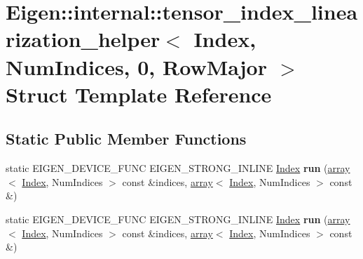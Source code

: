 \hypertarget{struct_eigen_1_1internal_1_1tensor__index__linearization__helper_3_01_index_00_01_num_indices_00_010_00_01_row_major_01_4}{}\section{Eigen\+:\+:internal\+:\+:tensor\+\_\+index\+\_\+linearization\+\_\+helper$<$ Index, Num\+Indices, 0, Row\+Major $>$ Struct Template Reference}
\label{struct_eigen_1_1internal_1_1tensor__index__linearization__helper_3_01_index_00_01_num_indices_00_010_00_01_row_major_01_4}
\subsection*{Static Public Member Functions}
\begin{DoxyCompactItemize}
\item 
\mbox{\label{struct_eigen_1_1internal_1_1tensor__index__linearization__helper_3_01_index_00_01_num_indices_00_010_00_01_row_major_01_4_ae99a24749608c2be04fae01f950a27e3}} 
static E\+I\+G\+E\+N\+\_\+\+D\+E\+V\+I\+C\+E\+\_\+\+F\+U\+NC E\+I\+G\+E\+N\+\_\+\+S\+T\+R\+O\+N\+G\+\_\+\+I\+N\+L\+I\+NE \hyperlink{namespace_eigen_a62e77e0933482dafde8fe197d9a2cfde}{Index} {\bfseries run} (\hyperlink{class_eigen_1_1array}{array}$<$ \hyperlink{namespace_eigen_a62e77e0933482dafde8fe197d9a2cfde}{Index}, Num\+Indices $>$ const \&indices, \hyperlink{class_eigen_1_1array}{array}$<$ \hyperlink{namespace_eigen_a62e77e0933482dafde8fe197d9a2cfde}{Index}, Num\+Indices $>$ const \&)
\item 
\mbox{\label{struct_eigen_1_1internal_1_1tensor__index__linearization__helper_3_01_index_00_01_num_indices_00_010_00_01_row_major_01_4_ae99a24749608c2be04fae01f950a27e3}} 
static E\+I\+G\+E\+N\+\_\+\+D\+E\+V\+I\+C\+E\+\_\+\+F\+U\+NC E\+I\+G\+E\+N\+\_\+\+S\+T\+R\+O\+N\+G\+\_\+\+I\+N\+L\+I\+NE \hyperlink{namespace_eigen_a62e77e0933482dafde8fe197d9a2cfde}{Index} {\bfseries run} (\hyperlink{class_eigen_1_1array}{array}$<$ \hyperlink{namespace_eigen_a62e77e0933482dafde8fe197d9a2cfde}{Index}, Num\+Indices $>$ const \&indices, \hyperlink{class_eigen_1_1array}{array}$<$ \hyperlink{namespace_eigen_a62e77e0933482dafde8fe197d9a2cfde}{Index}, Num\+Indices $>$ const \&)
\end{DoxyCompactItemize}


